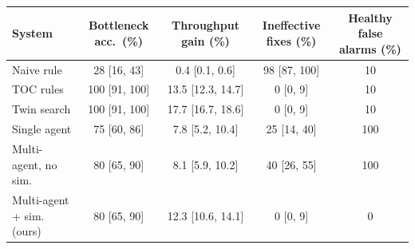 \begin{tabular}{lcccc}
\toprule
System & Bottleneck acc.\ (\%) & Throughput gain (\%) & Ineffective fixes (\%) & Healthy false alarms (\%) \\
\midrule
Naive rule & 28 [16, 43] & 0.4 [0.1, 0.6] & 98 [87, 100] & 10 \\
TOC rules & 100 [91, 100] & 13.5 [12.3, 14.7] & 0 [0, 9] & 10 \\
Twin search & 100 [91, 100] & 17.7 [16.7, 18.6] & 0 [0, 9] & 10 \\
Single agent & 75 [60, 86] & 7.8 [5.2, 10.4] & 25 [14, 40] & 100 \\
Multi-agent, no sim. & 80 [65, 90] & 8.1 [5.9, 10.2] & 40 [26, 55] & 100 \\
Multi-agent + sim. (ours) & 80 [65, 90] & 12.3 [10.6, 14.1] & 0 [0, 9] & 0 \\
\bottomrule
\end{tabular}
